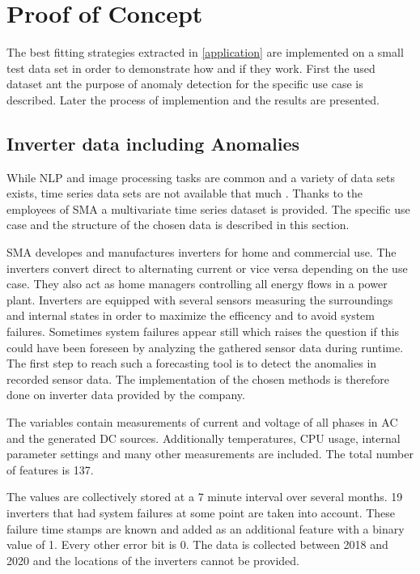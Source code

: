 \section{Proof of Concept}\label{implementation}
The best fitting strategies extracted in \autoref{application} are implemented on a small test data set in order to demonstrate how and if they work. First the used dataset ant the purpose of anomaly detection for the specific use case is described. Later the process of implemention and the results are presented.
\subsection{Inverter data including Anomalies}
While NLP and image processing tasks are common and a variety of data sets exists, time series data sets are not available that much \cite{ma_survey_2023}. Thanks to the employees of SMA a multivariate time series dataset is provided. The specific use case and the structure of the chosen data is described in this section.

SMA developes and manufactures inverters for home and commercial use. The inverters convert direct to alternating current or vice versa depending on the use case. They also act as home managers controlling all energy flows in a power plant. Inverters are equipped with several sensors measuring the surroundings and internal states in order to maximize the efficency and to avoid system failures. Sometimes system failures appear still which raises the question if this could have been foreseen by analyzing the gathered sensor data during runtime. The first step to reach such a forecasting tool is to detect the anomalies in recorded sensor data. The implementation of the chosen methods is therefore done on inverter data provided by the company.

The variables contain measurements of current and voltage of all phases in AC and the generated DC sources. Additionally temperatures, CPU usage, internal parameter settings and many other measurements are included. The total number of features is 137.

The values are collectively stored at a 7 minute interval over several months. 19 inverters that had system failures at some point are taken into account. These failure time stamps are known and added as an additional feature with a binary value of 1. Every other error bit is 0. The data is collected between 2018 and 2020 and the locations of the inverters cannot be provided.

